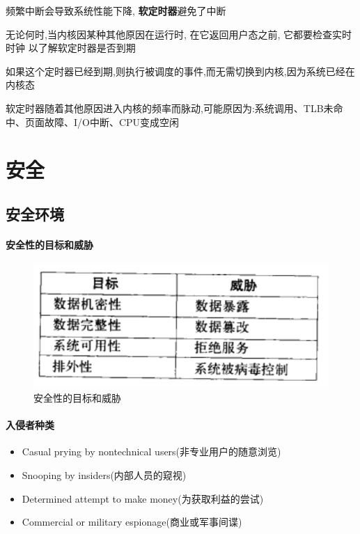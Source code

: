 \documentclass[UTF8,a4paper]{ctexart}
\begin{document}
频繁中断会导致系统性能下降, \textbf{软定时器}避免了中断

无论何时,当内核因某种其他原因在运行时, 在它返回用户态之前, 它都要检查实时时钟 以了解软定时器是否到期

如果这个定时器已经到期,则执行被调度的事件,而无需切换到内核,因为系统已经在内核态

软定时器随着其他原因进入内核的频率而脉动,可能原因为:系统调用、TLB未命中、页面故障、I/O中断、CPU变成空闲


\section{安全}
\subsection{安全环境}

\paragraph{安全性的目标和威胁}
\begin{figure}[H]
	\centering
	\includegraphics[scale = 0.5]{assets/ModernOperatingSystems/2018-01-10-20-01-55.png}
	\caption{安全性的目标和威胁}
\end{figure}

\paragraph{入侵者种类}
\begin{itemize}
	\item Casual prying by nontechnical users(非专业用户的随意浏览)
	\item Snooping by insiders(内部人员的窥视)
	\item Determined attempt to make money(为获取利益的尝试)
	\item Commercial or military espionage(商业或军事间谍)
\end{itemize}
\end{document}
